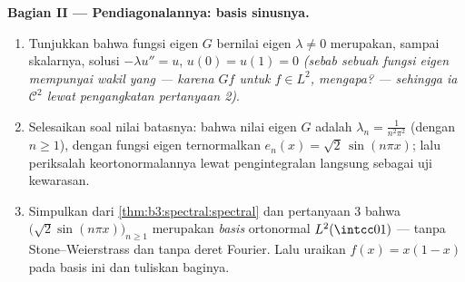 \begin{problem}
\medskip
\noindent\textbf{Bagian II --- Pendiagonalannya: basis
sinusnya.}
\begin{enumerate}[resume]
  \item Tunjukkan bahwa fungsi eigen $G$ bernilai eigen
        $\lambda \ne 0$ merupakan, sampai skalarnya, solusi
        $-\lambda u'' = u$, $u(0) = u(1) = 0$ \emph{(sebab sebuah
        fungsi eigen mempunyai wakil yang  --- karena $Gf$
         untuk $f \in L^2$, mengapa? --- sehingga ia
        $\mathcal C^2$ lewat pengangkatan pertanyaan 2)}.
  \item Selesaikan soal nilai batasnya: bahwa nilai eigen
        $G$ adalah $\lambda_n = \frac1{n^2\pi^2}$ (dengan $n \geq 1$),
        dengan fungsi eigen ternormalkan $e_n(x) =
        \sqrt2\,\sin(n\pi x)$; lalu periksalah keortonormalannya lewat
        pengintegralan langsung sebagai uji kewarasan.
  \item Simpulkan dari
        \cref{thm:b3:spectral:spectral} dan pertanyaan 3 bahwa
        $\bigl(\sqrt2\sin(n\pi x)\bigr)_{n\geq1}$ merupakan
        \emph{basis} ortonormal $L^2(\intcc01)$ --- tanpa
        Stone--Weierstrass dan tanpa deret Fourier. Lalu uraikan
        $f(x) = x(1-x)$ pada basis ini dan tuliskan 
        baginya.
\end{enumerate}


\end{problem}
